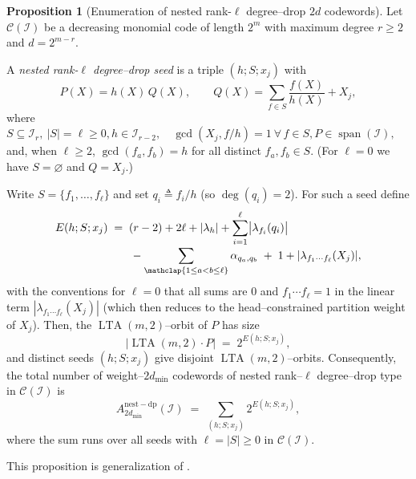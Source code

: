 \documentclass[conference]{IEEEtran}
\theoremstyle{definition}
\newtheorem{proposition}{Proposition}
\DeclareMathOperator{\LTA}{LTA}
\newcommand{\I}{\mathcal{I}}
\newcommand{\C}{\mathcal{C}}
\begin{document}
\begin{proposition}[Enumeration of nested rank-$\ell$ degree–drop $2d$ codewords]
\label{prop:nested-rank-l-deg-drop-enum}
Let $\C(\I)$ be a decreasing monomial code of length $2^m$ with
maximum degree $r\ge2$ and $d=2^{m-r}$.

A \emph{nested rank-$\ell$ degree–drop seed} is a triple $(h;S;x_j)$ with
\[
P(X)=h(X)\,Q(X),\qquad
Q(X)=\sum_{f\in S}\frac{f(X)}{h(X)} + X_j,
\]
where
\(
S\subseteq \I_r,\ |S|=\ell\ge0, 
h\in\I_{r-2},\quad
\gcd(X_j,f/h)=1\ \forall\,f\in S, P\in\operatorname{span}(\I),
\)
and, when $\ell\ge2$, $\gcd(f_a,f_b)=h$ for all distinct $f_a,f_b\in S$.
(For $\ell=0$ we have $S=\varnothing$ and $Q=X_j$.)

Write $S=\{f_1,\dots,f_\ell\}$ and set $q_i\triangleq f_i/h$ (so
$\deg(q_i)=2$).  For such a seed define
\[
\begin{aligned}
E(h;S;x_j)
&\;=\;
(r-2)+2\ell+|\lambda_h|
+\sum_{i=1}^{\ell}\bigl|\lambda_{f_i}(q_i)\bigr|
\\[-0.25em]
&\qquad
-\sum_{\mathclap{1\le a<b\le\ell}}\alpha_{q_a,q_b}
\;+\;1+|\lambda_{f_1\cdots f_{\ell}}(X_j)|,
\end{aligned}
\]
with the conventions for $\ell=0$ that all sums are $0$ and
$f_1\cdots f_\ell=1$ in the linear term
$|\lambda_{f_1\cdots f_{\ell}}(X_j)|$ (which then reduces to the 
head–constrained partition weight of $X_j$).  %
Then, the $\LTA(m,2)$–orbit of $P$ has size
        \[
          \bigl|\LTA(m,2)\cdot P\bigr|
          \;=\;
          2^{E(h;S;x_j)},
        \]
and distinct seeds $(h;S;x_j)$ give disjoint $\LTA(m,2)$–orbits. 
        Consequently, the total number of weight–$2d_{\min}$ codewords
        of nested rank–$\ell$ degree–drop type in $\C(\I)$ is
        \begin{equation}
          \label{eq:nested-rank-l-enum}
          A^{\mathrm{nest-dp}}_{2d_{\min}}(\I)
          \;=\;
          \sum_{(h;S;x_j)} 2^{E(h;S;x_j)},
        \end{equation}
        where the sum runs over all seeds with $\ell=|S|\ge0$ in $\C(\I)$.
\end{proposition}

This proposition is generalization of \cite[Lemma 1]{kasami1970weight}. 
\end{document}
